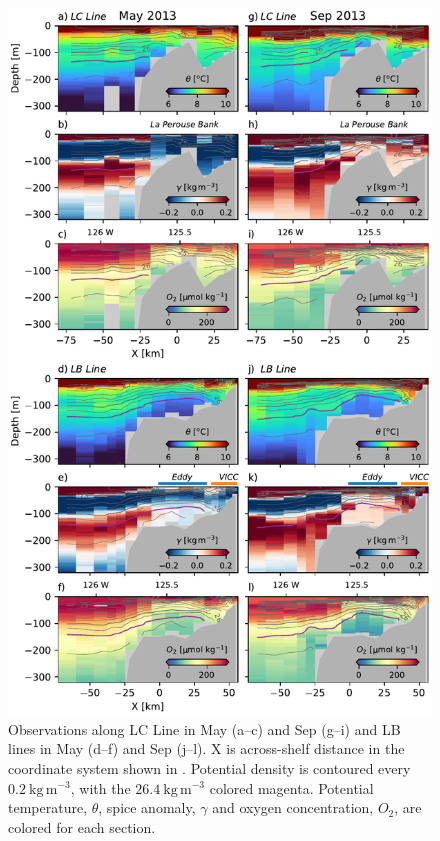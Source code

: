 \documentclass[draft]{agujournal2019}
\begin{document}
\begin{figure}[htbp]
  \begin{center}
     \includegraphics[width=5in]{LaPerouse2013Ctd}
     \caption{Observations along LC Line in May (a--c) and Sep (g--i) and LB lines in May (d--f) and Sep (j--l).  X is across-shelf distance in the coordinate system shown in . Potential density is contoured every $0.2\ \mathrm{kg\,m^{-3}}$, with the $26.4\ \mathrm{kg\,m^{-3}}$ colored magenta.  Potential temperature, $\theta$, spice anomaly, $\gamma$ and oxygen concentration, $O_2$, are colored for each section.}
     \label{fig:LaPerouse2013Ctd}
  \end{center}
\end{figure}
\end{document}
